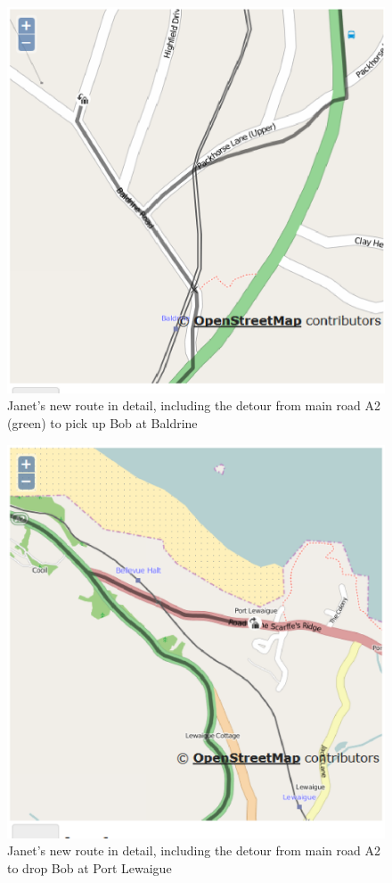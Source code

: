 \begin{figure}[h]
\includegraphics[scale=0.25]{images/maps/03-OSM-Pickup-Baldrine.eps}
\caption{Janet's new route in detail, including the detour from main road A2 (green) to pick up Bob at Baldrine}
\label{pic:bobRouteDetourPickup}
\end{figure}

\begin{figure}[h]
\includegraphics[scale=0.25]{images/maps/04-OSM-Drop-Lewaigue.eps}
\caption{Janet's new route in detail, including the detour from main road A2 to drop Bob at Port Lewaigue }
\label{pic:bobRouteDetourDrop}
\end{figure}



